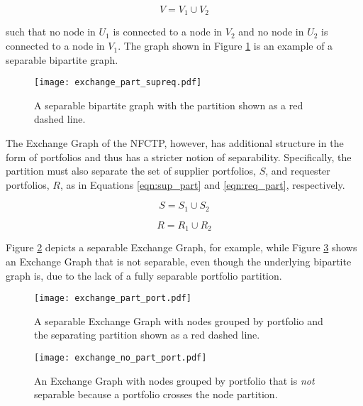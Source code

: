 \begin{equation}
  V = V_{1} \cup V_{2}
\end{equation}

such that no node in $U_1$ is connected to a node in $V_2$ and no node in $U_2$
is connected to a node in $V_1$. The graph shown in Figure \ref{fig:basic_part} is an
example of a separable bipartite graph.

\begin{figure}
  \begin{center}
    \texttt{[image: exchange\_part\_supreq.pdf]}
    \caption[]{
      \label{fig:basic_part}
      A separable bipartite graph with the partition shown as a red 
      dashed line.}
  \end{center}
\end{figure}

The Exchange Graph of the NFCTP, however, has additional structure in the form
of portfolios and thus has a stricter notion of separability. Specifically, the
partition must also separate the set of supplier portfolios, $S$, and requester
portfolios, $R$, as in Equations \ref{eqn:sup_part} and \ref{eqn:req_part},
respectively.

\begin{equation}\label{eqn:sup_part}
  S = S_{1} \cup S_{2}
\end{equation}

\begin{equation}\label{eqn:req_part}
  R = R_{1} \cup R_{2}
\end{equation}

Figure \ref{fig:port_part} depicts a separable Exchange Graph, for example,
while Figure \ref{fig:port_no_part} shows an Exchange Graph that is not
separable, even though the underlying bipartite graph is, due to the lack of a
fully separable portfolio partition.

\begin{figure}
  \begin{center}
    \texttt{[image: exchange\_part\_port.pdf]}
    \caption[]{
      \label{fig:port_part}
      A separable Exchange Graph with nodes grouped by portfolio and the
      separating partition shown as a red dashed line.}
  \end{center}
\end{figure}

\begin{figure}
  \begin{center}
    \texttt{[image: exchange\_no\_part\_port.pdf]}
    \caption[]{
      \label{fig:port_no_part}
      An Exchange Graph with nodes grouped by portfolio that is \textit{not}
      separable because a portfolio crosses the node partition.}
  \end{center}
\end{figure}

